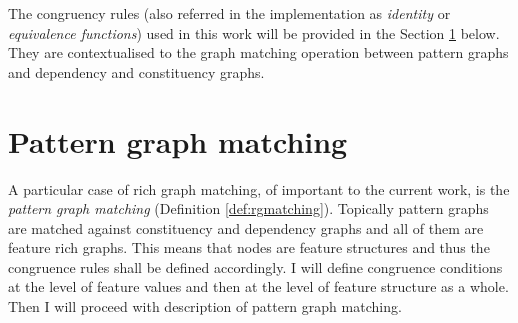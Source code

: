 %    

The congruency rules (also referred in the implementation as \textit{identity} or \textit{equivalence functions}) used in this work will be provided in the Section \ref{sec:pattern-graph-matching} below. They are contextualised to the graph matching operation between pattern graphs and dependency and constituency graphs. 

\section{Pattern graph matching}
\label{sec:pattern-graph-matching}
A particular case of rich graph matching, of important to the current work, is the \textit{pattern graph matching} (Definition \ref{def:rgmatching}). Topically pattern graphs are matched against constituency and dependency graphs and all of them are feature rich graphs. This means that nodes are feature structures and thus the congruence rules shall be defined accordingly. I will define congruence conditions at the level of feature values and then at the level of feature structure as a whole. Then I will proceed with description of pattern graph matching. 

